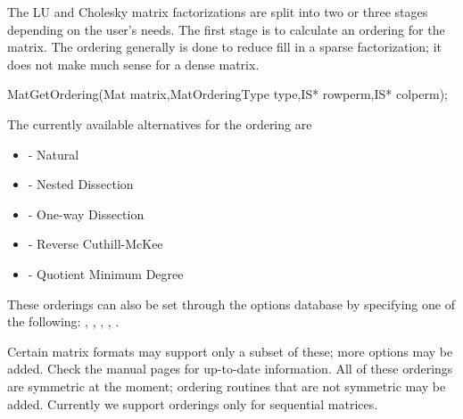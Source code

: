 {{{\medskip \medskip

The LU and Cholesky 
matrix factorizations are split into 
two or three stages depending on the user's needs. The first stage is 
to calculate an ordering for the matrix.  The ordering generally is 
done to reduce fill in a sparse factorization; it does not make much 
sense for a dense matrix.  
\begin{tabbing}
  MatGetOrdering(Mat matrix,MatOrderingType type,IS* rowperm,IS* colperm); 
\end{tabbing}
The currently available alternatives for the ordering  are 
\begin{itemize}
\item {} - Natural
\item {} - Nested Dissection
\item {} - One-way Dissection
\item {} - Reverse Cuthill-McKee
\item {} - Quotient Minimum Degree
\end{itemize}
These orderings can also be set through the options database by specifying 
one of the following:   ,  , 
 ,  , 
.
  
  
  
 

Certain matrix formats may support only a subset of these; more options may 
be added. Check the manual pages for up-to-date information. All of these orderings are 
symmetric at the moment; ordering routines that are 
not symmetric may be added. Currently we support orderings only for 
sequential matrices.

}}}
